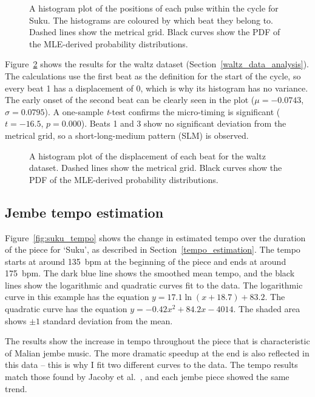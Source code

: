 \documentclass[12pt,twoside,openright]{report}
\begin{document}
\begin{figure}[ht]
    \centering
    
    \caption{A histogram plot of the positions of each pulse within the cycle for Suku. The histograms are coloured by which beat they belong to. Dashed lines show the metrical grid. Black curves show the PDF of the MLE-derived probability distributions.}
    \label{fig:suku_histogram}
\end{figure}

Figure~\ref{fig:waltz_histogram} shows the results for the waltz dataset (Section~\ref{waltz_data_analysis}). The calculations
use the first beat as the definition for the start of the cycle, so every beat 1
has a displacement of 0, which is why its histogram has no variance. The early onset
of the second beat can be clearly seen in the plot ($\mu=-0.0743$, $\sigma=0.0795$). A
one-sample \textit{t}-test confirms the micro-timing is significant ($t=-16.5$, $p=0.000$). Beats 1 and 3 show no significant deviation from the metrical grid, so a short-long-medium pattern (SLM) is observed.

\begin{figure}[ht]
    \centering
    
    \caption{A histogram plot of the displacement of each beat for the waltz dataset. Dashed lines show the metrical grid. Black curves show the PDF of the MLE-derived probability distributions.}
    \label{fig:waltz_histogram}
\end{figure}


\subsection{Jembe tempo estimation} \label{jembe_tempo_estimation_results}

Figure~\ref{fig:suku_tempo} shows the change in estimated tempo over the duration of the piece for
`Suku', as described in Section~\ref{tempo_estimation}. The tempo starts at around 135~bpm at the beginning of the piece and
ends at around 175~bpm. The dark blue line shows the smoothed mean tempo, and
the black lines show the logarithmic and quadratic curves fit to the data. The
logarithmic curve in this example has the equation $y=17.1 \ln(x+18.7)+83.2$.
The quadratic curve has the equation $y=-0.42x^2+84.2x-4014$. The
shaded area shows $\pm1$ standard deviation from the mean.

The results show the increase in tempo throughout the piece that is characteristic of Malian jembe music. The more dramatic speedup at the end is also reflected in this data -- this is why I fit two different curves to the data. The tempo results match those found by Jacoby et al.\ \cite{jacoby2021supp}, and each jembe piece showed the same trend.
\end{document}
